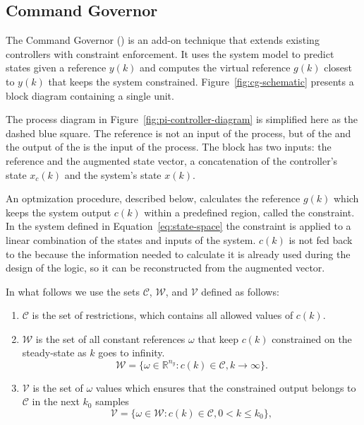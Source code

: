 \subsection{Command Governor}%
\label{subsec:cg}

The Command Governor (\CG{}) is an add-on technique that extends existing
controllers with constraint enforcement. It uses the system model to predict
states given a reference \(y(k)\) and computes the virtual reference \(g(k)\)
closest to \(y(k)\) that keeps the system constrained.
Figure~\ref{fig:cg-schematic} presents a block diagram containing a single \CG{}
unit.



The process diagram in Figure~\ref{fig:pi-controller-diagram} is simplified here
as the dashed blue square. The reference is not an input of the process, but of
the \CG{} and the output of the \CG{} is the input of the process. The \CG{}
block has two inputs: the reference and the augmented state vector, a
concatenation of the controller's state \(x_{c}(k)\) and the system's state
\(x(k)\).

An optmization procedure, described below, calculates the reference \(g(k)\)
which keeps the system output \(c(k)\) within a predefined region, called the
constraint. In the system defined in Equation~\eqref{eq:state-space} the
constraint is applied to a linear combination of the states and inputs of the
system. \(c(k)\) is not fed back to the \CG{} because the information needed to
calculate it is already used during the design of the \CG{} logic, so it can be
reconstructed from the augmented vector.

In what follows we use the sets \(\mathcal{C}\), \(\mathcal{W}\), and
\(\mathcal{V}\) defined as follows:

\begin{enumerate}
  \item \(\mathcal{C}\) is the set of restrictions, which contains all allowed
        values of \(c(k)\).
  \item \(\mathcal{W}\) is the set of all constant references \(\omega{}\) that keep
        \(c(k)\) constrained on the steady-state as \(k\) goes to infinity.
        \[\mathcal{W} = \{\omega\in\mathbb{R}^{n_y}:
          c(k)\in\mathcal{C},k\rightarrow\infty{}\}.\]
  \item \(\mathcal{V}\) is the set of \(\omega{}\) values which ensures that the
        constrained output belongs to \(\mathcal{C}\) in the next \(k_0\)
        samples
        \[
          \mathcal{V}=\{\omega\in\mathcal{W}:c(k)\in\mathcal{C},0<k\leq{}k_0\},
        \]
\end{enumerate}

